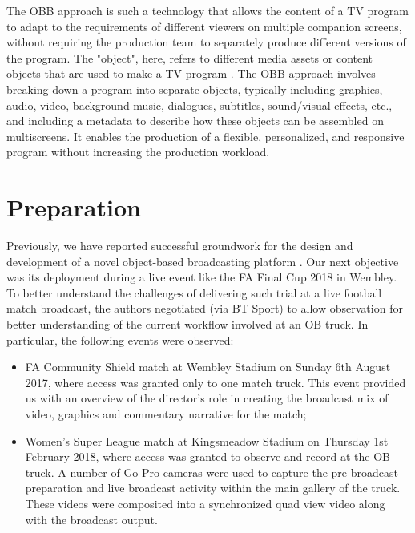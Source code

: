 \documentclass[sigchi-a, authorversion]{acmart}
\begin{document}
The OBB approach is such a technology that allows the content of a TV program to adapt to the requirements of different viewers on multiple companion screens, without requiring the production team to separately produce different versions of the program. The "object", here, refers to different media assets or content objects that are used to make a TV program \cite{armstrong2014}. The OBB approach involves breaking down a program into separate objects, typically including graphics, audio, video, background music, dialogues, subtitles, sound/visual effects, etc., and including a metadata to describe how these objects can be assembled on multiscreens. It enables the production of a flexible, personalized, and responsive program without increasing the production workload\cite{kegel2017, williams2016}.

\section{Preparation}

Previously, we have reported successful groundwork for the design and development of a novel object-based broadcasting platform \cite{kegel2017, Li:2018_CHI, Li:2018_TVX}. Our next objective was its deployment during a live event like the FA Final Cup 2018 in Wembley. To better understand the challenges of delivering such trial at a live football match broadcast, the authors negotiated (via BT Sport) to allow observation for better understanding of the current workflow involved at an OB truck. In particular, the following events were observed:
\begin{itemize}
  \item FA Community Shield match at Wembley Stadium on Sunday 6th August 2017, where access was granted only to one match truck. This event provided us with an overview of the director's role in creating the broadcast mix of video, graphics and commentary narrative for the match;
  \item Women's Super League match at Kingsmeadow Stadium on Thursday 1st February 2018, where access was granted to observe and record at the OB truck. A number of Go Pro cameras were used to capture the pre-broadcast preparation and live broadcast activity within the main gallery of the truck. These videos were composited into a synchronized quad view video along with the broadcast output.
\end{itemize}
\end{document}
